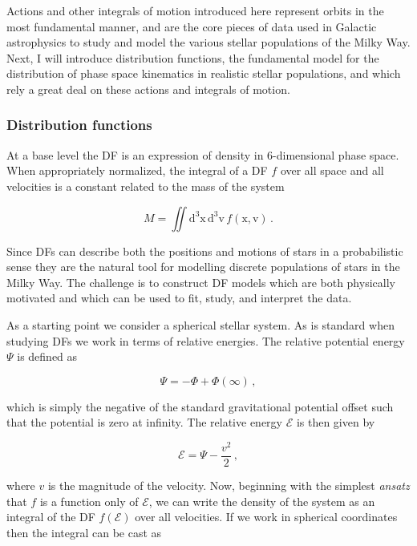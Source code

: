 Actions and other integrals of motion introduced here represent orbits in the most fundamental manner, and are the core pieces of data used in Galactic astrophysics to study and model the various stellar populations of the Milky Way. Next, I will introduce distribution functions, the fundamental model for the distribution of phase space kinematics in realistic stellar populations, and which rely a great deal on these actions and integrals of motion.

\subsubsection{Distribution functions}

At a base level the DF is an expression of density in 6-dimensional phase space. When appropriately normalized, the integral of a DF $f$ over all space and all velocities is a constant related to the mass of the system

\begin{equation}
    \label{ch1:eq:df-normalization}
    M = \iint \mathrm{d}^3\mathbf{\mathrm{x}}\, \mathrm{d}^3\mathbf{\mathrm{v}}\, f( \mathbf{\mathrm{x}}, \mathbf{\mathrm{v}}) \,.
\end{equation}

\noindent Since DFs can describe both the positions and motions of stars in a probabilistic sense they are the natural tool for modelling discrete populations of stars in the Milky Way. The challenge is to construct DF models which are both physically motivated and which can be used to fit, study, and interpret the data.

As a starting point we consider a spherical stellar system. As is standard when studying DFs we work in terms of relative energies. The relative potential energy $\Psi$ is defined as 

\begin{equation}
    \label{ch1:eq:relative-potential-energy}
    \Psi = -\Phi + \Phi(\infty)\,,
\end{equation}

\noindent which is simply the negative of the standard gravitational potential offset such that the potential is zero at infinity. The relative energy $\mathcal{E}$ is then given by

\begin{equation}
    \label{ch1:eq:relative-energy}
    \mathcal{E} = \Psi - \frac{v^{2}}{2}\,,
\end{equation}

\noindent where $v$ is the magnitude of the velocity. Now, beginning with the simplest \textit{ansatz} that $f$ is a function only of $\mathcal{E}$, we can write the density of the system as an integral of the DF $f(\mathcal{E})$ over all velocities. If we work in spherical coordinates then the integral can be cast as 

